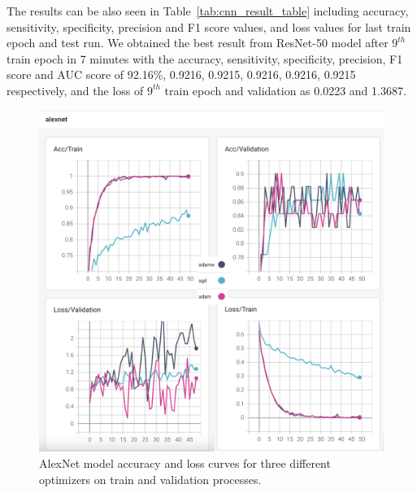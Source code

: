 The results can be also seen in Table~\ref{tab:cnn_result_table} including accuracy, sensitivity, specificity, precision and F1 score values, and loss values for last train epoch and test run. We obtained the best result from ResNet-50 model after $9^{th}$ train epoch in 7 minutes with the accuracy, sensitivity, specificity, precision, F1 score and AUC score of 92.16\%, 0.9216, 0.9215, 0.9216, 0.9216, 0.9215 respectively, and the loss of $9^{th}$ train epoch and validation as 0.0223 and 1.3687.

\begin{figure}[!h]
    \centering
    \includegraphics[width=\linewidth]{fig/alexnet.png}
    \vspace{2mm}
    \caption{AlexNet model accuracy and loss curves for three different optimizers on train and validation processes.}
    \label{fig:alexnet_plots}
\end{figure}

